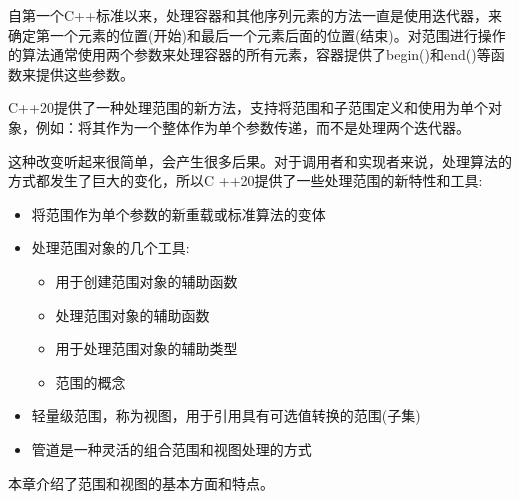 自第一个C++标准以来，处理容器和其他序列元素的方法一直是使用迭代器，来确定第一个元素的位置(开始)和最后一个元素后面的位置(结束)。对范围进行操作的算法通常使用两个参数来处理容器的所有元素，容器提供了begin()和end()等函数来提供这些参数。

C++20提供了一种处理范围的新方法，支持将范围和子范围定义和使用为单个对象，例如：将其作为一个整体作为单个参数传递，而不是处理两个迭代器。

这种改变听起来很简单，会产生很多后果。对于调用者和实现者来说，处理算法的方式都发生了巨大的变化，所以C
++20提供了一些处理范围的新特性和工具:


\begin{itemize}
\item
将范围作为单个参数的新重载或标准算法的变体

\item
处理范围对象的几个工具:
\begin{itemize}
\item
用于创建范围对象的辅助函数

\item
处理范围对象的辅助函数

\item
用于处理范围对象的辅助类型

\item
范围的概念
\end{itemize}

\item
轻量级范围，称为视图，用于引用具有可选值转换的范围(子集)

\item
管道是一种灵活的组合范围和视图处理的方式
\end{itemize}

本章介绍了范围和视图的基本方面和特点。





